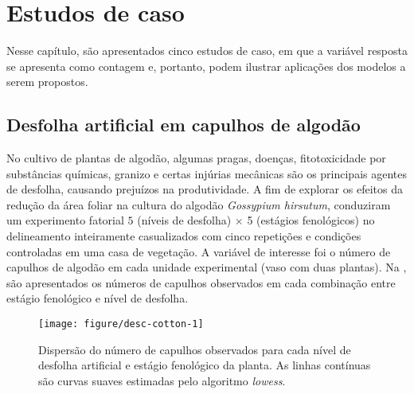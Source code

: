 \documentclass[
    oldfontcommands,
    11pt,
    openright,
    twoside,
    a4paper,
    english,
    brazil
]{abntex2}\usepackage[]{graphicx}\usepackage[]{color}
\newenvironment{knitrout}{}{} %
\begin{document}
\chapter{Estudos de caso}
\label{cha:estudosdecaso}

Nesse capítulo, são apresentados cinco estudos de caso, em que a
variável resposta se apresenta como contagem e, portanto, podem ilustrar
aplicações dos modelos a serem propostos.

\section{Desfolha artificial em capulhos de algodão}
\label{sec:cotton}

No cultivo de plantas de algodão, algumas pragas, doenças,
fitotoxicidade por substâncias químicas, granizo e certas injúrias
mecânicas são os principais agentes de desfolha, causando prejuízos na
produtividade. A fim de explorar os efeitos da redução da área foliar na
cultura do algodão \textit{Gossypium hirsutum}, \citet{Silva2012}
conduziram um experimento fatorial $5$ (níveis de desfolha) $\times $ 5
(estágios fenológicos) no delineamento inteiramente casualizados com
cinco repetições e condições controladas em uma casa de vegetação. A
variável de interesse foi o número de capulhos de algodão em cada
unidade experimental (vaso com duas plantas). Na
, são apresentados os números de capulhos
observados em cada combinação entre estágio fenológico e nível de
desfolha.

\begin{knitrout}
\color{fgcolor}\begin{figure}[!htb]

{\centering \texttt{[image: figure/desc-cotton-1]} 

}

\caption[Dispersão do número de capulhos observados para cada nível de desfolha artificial e estágio fenológico da planta]{Dispersão do número de capulhos observados para cada nível de desfolha artificial e estágio fenológico da planta. As linhas contínuas são curvas suaves estimadas pelo algoritmo \textit{lowess}.}\label{fig:desc-cotton}
\end{figure}


\end{knitrout}
\end{document}
